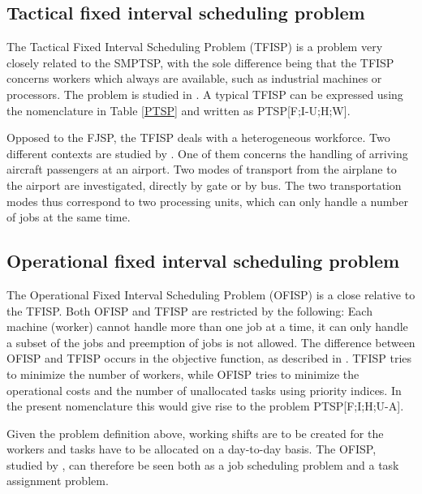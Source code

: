 \subsection{Tactical fixed interval scheduling problem} \label{TFISP}
The Tactical Fixed Interval Scheduling Problem (TFISP) is a problem very closely related to the SMPTSP, with the sole difference being that the TFISP concerns workers which always are available, such as industrial machines or processors. The problem is studied in \citet{kroon_1995}. A typical TFISP can be expressed using the nomenclature in Table \ref{PTSP} and written as PTSP[F;I-U;H;W].

Opposed to the FJSP, the TFISP deals with a heterogeneous workforce. Two different contexts are studied by \citet{kroon_1995}. One of them concerns the handling of arriving aircraft passengers at an airport. Two modes of transport from the airplane to the airport are investigated, directly by gate or by bus. The two transportation modes thus correspond to two processing units, which can only handle a number of jobs at the same time.

\subsection{Operational fixed interval scheduling problem}
The Operational Fixed Interval Scheduling Problem (OFISP) is a close relative to the TFISP. Both OFISP and TFISP are restricted by the following: Each machine (worker) cannot handle more than one job at a time, it can only handle a subset of the jobs and preemption of jobs is not allowed. The difference between OFISP and TFISP occurs in the objective function, as described in \citet{kroon_1995}. TFISP tries to minimize the number of workers, while OFISP tries to minimize the operational costs and the number of unallocated tasks using priority indices. In the present nomenclature this would give rise to the problem PTSP[F;I;H;U-A].

Given the problem definition above, working shifts are to be created for the workers and tasks have to be allocated on a day-to-day basis. The OFISP, studied by \citet{kroon_1995}, can therefore be seen both as a job scheduling problem and a task assignment problem.



%


